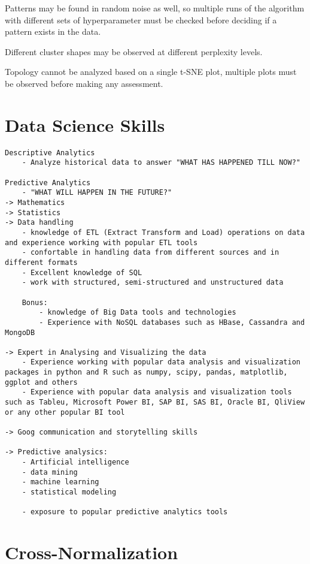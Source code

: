 \documentclass[
]{book}
\begin{document}
Patterns may be found in random noise as well, so multiple runs of the algorithm with different sets of hyperparameter must be checked before deciding if a pattern exists in the data.

Different cluster shapes may be observed at different perplexity levels.

Topology cannot be analyzed based on a single t-SNE plot, multiple plots must be observed before making any assessment.

\hypertarget{data-science-skills}{%
\section{Data Science Skills}\label{data-science-skills}}

\begin{verbatim}
Descriptive Analytics
    - Analyze historical data to answer "WHAT HAS HAPPENED TILL NOW?"

Predictive Analytics
    - "WHAT WILL HAPPEN IN THE FUTURE?"
-> Mathematics
-> Statistics
-> Data handling
    - knowledge of ETL (Extract Transform and Load) operations on data and experience working with popular ETL tools
    - confortable in handling data from different sources and in different formats
    - Excellent knowledge of SQL
    - work with structured, semi-structured and unstructured data

    Bonus:
        - knowledge of Big Data tools and technologies
        - Experience with NoSQL databases such as HBase, Cassandra and MongoDB

-> Expert in Analysing and Visualizing the data
    - Experience working with popular data analysis and visualization packages in python and R such as numpy, scipy, pandas, matplotlib, ggplot and others
    - Experience with popular data analysis and visualization tools such as Tableu, Microsoft Power BI, SAP BI, SAS BI, Oracle BI, QliView or any other popular BI tool

-> Goog communication and storytelling skills

-> Predictive analysics:
    - Artificial intelligence
    - data mining
    - machine learning
    - statistical modeling

    - exposure to popular predictive analytics tools
\end{verbatim}

\hypertarget{cross-normalization}{%
\section{Cross-Normalization}\label{cross-normalization}}
\end{document}
